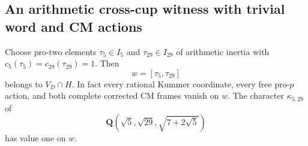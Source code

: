 \subsection{An arithmetic cross-cup witness with trivial word and CM actions}
\label{sec:cross-cup-residual-inertia}

\begin{proposition}\label{prop:cross-cup-residual-inertia}
Choose pro-two elements \(\tau_5\in I_5\) and
\(\tau_{29}\in I_{29}\) of arithmetic inertia with
\(c_5(\tau_5)=c_{29}(\tau_{29})=1\).
Then
\[
                         w=[\tau_5,\tau_{29}]
\]
belongs to \(V_D\cap H\). In fact every rational Kummer
coordinate, every free pro-\(p\) action, and both
complete corrected CM frames vanish on \(w\).
The character \(\kappa_{5,29}\) of
\[
 \mathbf Q(\sqrt5,\sqrt{29},\sqrt{7+2\sqrt5})
\]
has value one on \(w\).
\end{proposition}

